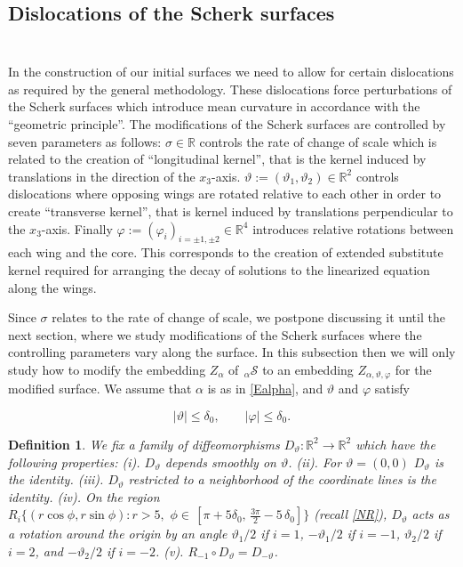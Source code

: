 \documentclass[12pt,namelimits,sumlimits]{amsart}
\newtheorem{definition}[theorem]{Definition}
\theoremstyle{remark}
\numberwithin{equation}{section}
\begin{document}
\subsection*{Dislocations of the Scherk surfaces}
$\phantom{ab}$
\nopagebreak

In the construction of our initial surfaces we need to allow for certain
dislocations as required by the general methodology.
These dislocations force perturbations
of the Scherk surfaces which introduce mean curvature 
in accordance with the
``geometric principle''.
The modifications of the Scherk surfaces are controlled by seven parameters
as follows:
$\sigma\in{\mathbb{R}}$ controls the rate of change of scale which is related to the
creation of ``longitudinal kernel'',
that is the kernel induced by translations in the direction of the $x_3$-axis.
$\vartheta:=(\vartheta_1,\vartheta_2)\in{{{\mathbb{R}}^2}}$ controls dislocations where opposing
wings are rotated relative to each other in order to create ``transverse kernel'',
that is kernel induced by translations perpendicular to the $x_3$-axis.
Finally 
$\varphi:=(\varphi_i)_{{i=\pm1,\pm2}}\in{{{\mathbb{R}}^4}}$
introduces relative rotations between each wing and the core.
This corresponds to the creation of extended substitute kernel
required for arranging the decay of solutions to the linearized equation
along the wings.

Since $\sigma$ relates to the rate of change of scale,
we postpone discussing it until the next section,
where we study modifications of the Scherk surfaces
where the controlling parameters vary along the surface.
In this subsection then we will only study how to
modify the embedding $Z_\alpha$ of ${{{}_{\,\alpha\!}\mathcal{S}}}$
to an embedding $Z_{{\alpha,\vartheta,\varphi}}$ for the modified surface.
We assume that $\alpha$ is as in \ref{Ealpha},
and $\vartheta$ and $\varphi$ satisfy
\addtocounter{theorem}{1}
\begin{equation}
\label{Ethph}
|\vartheta|\le\delta_0, \qquad |\varphi|\le\delta_0.
\end{equation}

\addtocounter{equation}{1}
\begin{definition}
\label{DDvartheta}
We fix a family of diffeomorphisms $D_{\vartheta}:{{{\mathbb{R}}^2}}\to{{{\mathbb{R}}^2}}$
which have the following properties:
\newline
(i). $D_{\vartheta}$ depends smoothly on $\vartheta$.
\newline
(ii). For $\vartheta=(0,0)$ $D_{\vartheta}$ is the identity.
\newline
(iii).
$D_\vartheta$ restricted to a neighborhood of the coordinate lines is the identity.
\newline
(iv).
On the region
$R_i\{(r\cos\phi,r\sin\phi): r>5,\,\,
\phi\in\,[\pi+5\delta_0,\,\frac{3\pi}2- 5\,\delta_0]\}
$
(recall \ref{NR}),
$D_\vartheta$ acts as a rotation around the origin
by an angle
$\vartheta_1/2$ if $i=1$,
$-\vartheta_1/2$ if $i=-1$,
$\vartheta_2/2$ if $i=2$,
and
$-\vartheta_2/2$ if $i=-2$.
\newline
(v).
$R_{-1}\circ D_{\vartheta}=D_{-\vartheta}$.
\end{definition}
\end{document}
